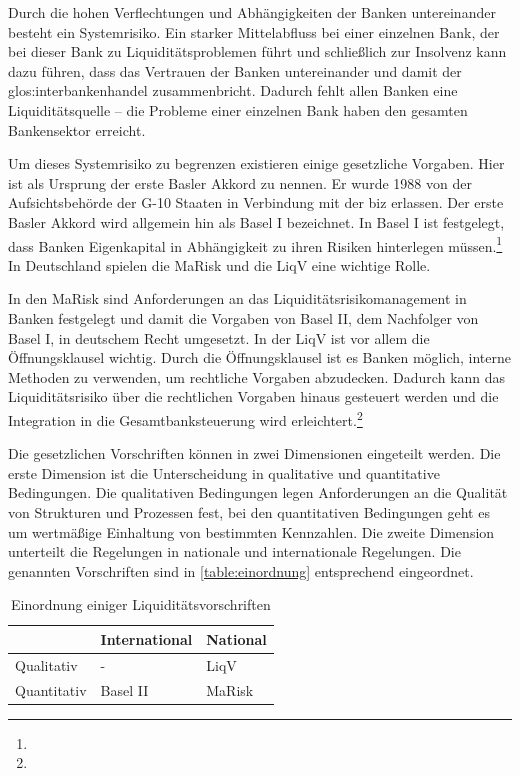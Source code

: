 \begin{onehalfspacing}
Durch die hohen Verflechtungen und Abhängigkeiten der Banken untereinander besteht ein Systemrisiko. Ein starker Mittelabfluss bei einer einzelnen Bank, der bei dieser Bank zu Liquiditätsproblemen führt und schließlich zur Insolvenz kann dazu führen, dass das Vertrauen der Banken untereinander und damit der \gls{glos:interbankenhandel} zusammenbricht. Dadurch fehlt allen Banken eine Liquiditätsquelle -- die Probleme einer einzelnen Bank haben den gesamten Bankensektor erreicht.

Um dieses Systemrisiko zu begrenzen existieren einige gesetzliche Vorgaben. Hier ist als Ursprung der erste Basler Akkord zu nennen. Er wurde 1988 von der Aufsichtsbehörde der G-10 Staaten in Verbindung mit der \gls{biz} erlassen. Der erste Basler Akkord wird allgemein hin als Basel I bezeichnet. In Basel I ist festgelegt, dass Banken Eigenkapital in Abhängigkeit zu ihren Risiken hinterlegen müssen.\footnote{ } In Deutschland spielen die \gls{MaRisk} und die \gls{LiqV} eine wichtige Rolle.

In den \gls{MaRisk} sind Anforderungen an das Liquiditätsrisikomanagement in Banken festgelegt und damit die Vorgaben von Basel II, dem Nachfolger von Basel I, in deutschem Recht umgesetzt. In der \gls{LiqV} ist vor allem die Öffnungsklausel wichtig. Durch die Öffnungsklausel ist es Banken möglich, interne Methoden zu verwenden, um rechtliche Vorgaben abzudecken. Dadurch kann das Liquiditätsrisiko über die rechtlichen Vorgaben hinaus gesteuert werden und die Integration in die Gesamtbanksteuerung wird erleichtert.\footnote{ }

Die gesetzlichen Vorschriften können in zwei Dimensionen eingeteilt werden. Die erste Dimension ist die Unterscheidung in qualitative und quantitative Bedingungen. Die qualitativen Bedingungen legen Anforderungen an die Qualität von Strukturen und Prozessen fest, bei den quantitativen Bedingungen geht es um wertmäßige Einhaltung von bestimmten Kennzahlen. Die zweite Dimension unterteilt die Regelungen in nationale und internationale Regelungen. Die genannten Vorschriften sind in \vref{table:einordnung} entsprechend eingeordnet.

{
\setlength{\extrarowheight}{2pt}
\begin{table}[htbp]
\centering
\begin{tabular}{| l | >{\centering\arraybackslash} m{4cm} | >{\centering\arraybackslash} m{4cm} |}
\cline{2-3}
\multicolumn{1}{l|}{}	& International & National 		\\	\hline
Qualitativ 				& - 			& \gls{LiqV}	\\	\hline
Quantitativ 			& Basel II 		& \gls{MaRisk}	\\	\hline
\end{tabular} 
\caption{Einordnung einiger Liquiditätsvorschriften \label{table:einordnung}}
\end{table}
}


\end{onehalfspacing}
